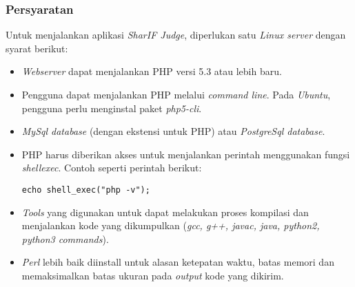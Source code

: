 \subsubsection{Persyaratan}
\label{subsubsec:persyaratan}
Untuk menjalankan aplikasi \textit{SharIF Judge}, diperlukan satu \textit{Linux server} dengan syarat berikut:
\begin{itemize}
	\item \textit{Webserver} dapat menjalankan PHP versi 5.3 atau lebih baru.
	\item Pengguna dapat menjalankan PHP melalui \textit{command line}. Pada \textit{Ubuntu}, pengguna perlu menginstal paket \textit{php5-cli}.
	\item \textit{MySql database} (dengan ekstensi untuk PHP) atau \textit{PostgreSql database}.
	\item PHP harus diberikan akses untuk menjalankan perintah menggunakan fungsi \textit{shell\textunderscore exec}. Contoh seperti perintah berikut:
	\begin{lstlisting}[basicstyle=\ttfamily, frame=single,
	columns=fullflexible, keepspaces=true, breaklines=true, label=ls:1]
	echo shell_exec("php -v");
	\end{lstlisting}
	\item \textit{Tools} yang digunakan untuk dapat melakukan proses kompilasi dan menjalankan kode yang dikumpulkan (\textit{gcc, g++, javac, java, python2, python3 commands}).
	\item \textit{Perl} lebih baik diinstall untuk alasan ketepatan waktu, batas memori dan memaksimalkan batas ukuran pada \textit{output} kode yang dikirim.
\end{itemize}

